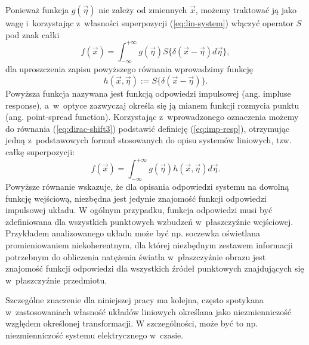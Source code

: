 Ponieważ funkcja $g(\vec{\eta})$ nie zależy od zmiennych $\vec{x}$, możemy traktować ją jako wagę i~korzystając z~własności superpozycji (\ref{eq:lin-system}) włączyć operator $S{}$ pod znak całki
\begin{equation}
f(\vec{x})=\int_{-\infty}^{+\infty} g(\vec{\eta})  S\{\delta(\vec{x}-\vec{\eta}) d \vec{\eta} \},
\label{eq:dirac-shift3}
\end{equation}
dla uproszczenia zapisu powyższego równania wprowadzimy funkcję
\begin{equation}
h(\vec{x},\vec{\eta}):=S\{\delta(\vec{x}-\vec{\eta})\}.
\label{eq:imp-resp}
\end{equation}
Powyższa funkcja nazywana jest funkcją odpowiedzi impulsowej (ang. impluse response), a~w~optyce zazwyczaj określa się ją mianem funkcji rozmycia punktu (ang. point-spread function). Korzystając z~wprowadzonego oznaczenia możemy do równania (\ref{eq:dirac-shift3})  podstawić definicję (\ref{eq:imp-resp}), otrzymując jedną z~podstawowych formuł stosowanych do opisu systemów liniowych, tzw. całkę superpozycji:
\begin{equation}
f(\vec{x})=\int_{-\infty}^{+\infty} g(\vec{\eta})  h(\vec{x},\vec{\eta}) d \vec{\eta} .
\label{eq:sup-int}
\end{equation}
Powyższe równanie wskazuje, że dla opisania odpowiedzi systemu na dowolną funkcję wejściową, niezbędna jest jedynie znajomość funkcji odpowiedzi impulsowej układu. W ogólnym przypadku, funkcja odpowiedzi musi być zdefiniowana dla wszystkich punktowych wzbudzeń w~płaszczyźnie wejściowej. Przykładem analizowanego układu może być np. soczewka oświetlana promieniowaniem niekoherentnym, dla której niezbędnym zestawem informacji potrzebnym do obliczenia natężenia światła w~płaszczyźnie obrazu jest znajomość funkcji odpowiedzi dla wszystkich źródeł punktowych znajdujących się w~płaszczyźnie przedmiotu. 

Szczególne znaczenie dla niniejszej pracy ma kolejna, często spotykana w~zastosowaniach własność układów liniowych określana jako niezmienniczość względem określonej transformacji. W szczególności, może być to np. niezmienniczość systemu elektrycznego w~czasie. 

